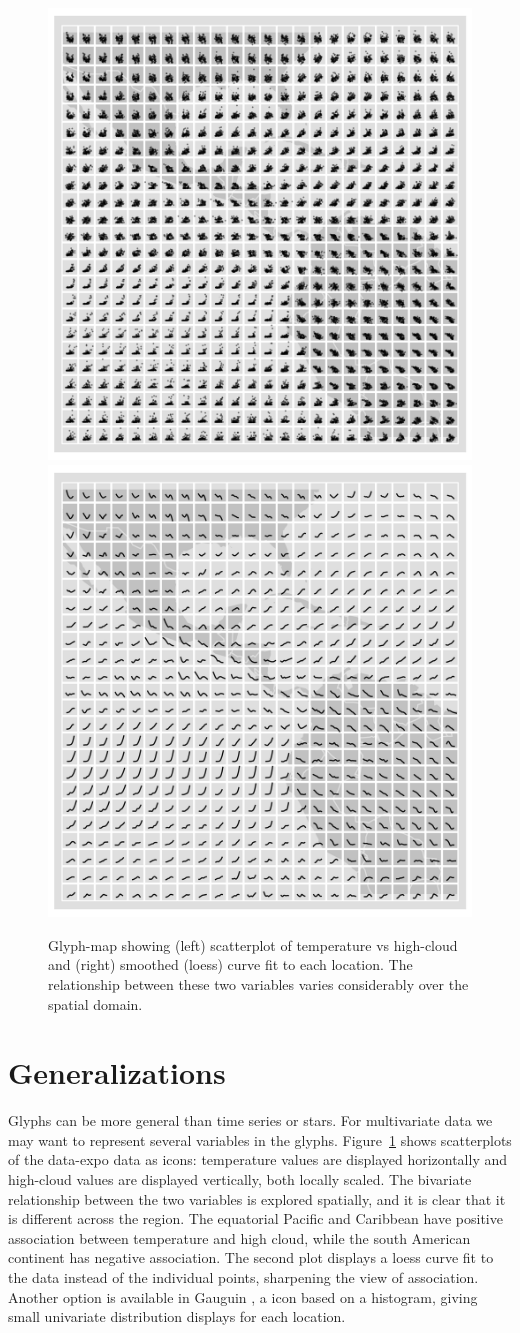 \documentclass[oneside]{article}
\begin{document}
\begin{figure}[htbp]
  \centering
  \includegraphics[width=0.5\linewidth]{nasa-scat-glyph}%
  \includegraphics[width=0.5\linewidth]{nasa-loess-glyph}

  \caption{Glyph-map showing (left) scatterplot of temperature vs high-cloud and (right) smoothed (loess) curve fit to each location. The relationship between these two variables varies considerably over the spatial domain. }
  \label{fig:cloud}
\end{figure}

\section{Generalizations}

Glyphs can be more general than time series or stars. For multivariate data we may want to represent several variables in the glyphs. Figure~\ref{fig:cloud} shows scatterplots of the data-expo data as icons: temperature values are displayed horizontally and high-cloud values are displayed vertically, both locally scaled. The bivariate relationship between the two variables is explored spatially, and it is clear that it is different across the region. The equatorial Pacific and Caribbean have positive association between temperature and high cloud, while the south American continent has negative association. The second plot displays a loess curve fit to the data instead of the individual points, sharpening the view of association. Another option is available in Gauguin \citep{gribov:2006}, a icon based on a histogram, giving small univariate distribution displays for each location.
\end{document}
